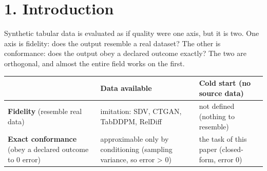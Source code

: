 \hypertarget{introduction}{%
\section{1. Introduction}\label{introduction}}

Synthetic tabular data is evaluated as if quality were one axis, but it
is two. One axis is fidelity: does the output resemble a real dataset?
The other is conformance: does the output obey a declared outcome
exactly? The two are orthogonal, and almost the entire field works on
the first.

\begin{longtable}[]{@{}lll@{}}
\toprule
\begin{minipage}[b]{0.30\columnwidth}\raggedright
\strut
\end{minipage} & \begin{minipage}[b]{0.30\columnwidth}\raggedright
Data available\strut
\end{minipage} & \begin{minipage}[b]{0.30\columnwidth}\raggedright
Cold start (no source data)\strut
\end{minipage}\tabularnewline
\midrule
\endhead
\begin{minipage}[t]{0.30\columnwidth}\raggedright
\textbf{Fidelity} (resemble real data)\strut
\end{minipage} & \begin{minipage}[t]{0.30\columnwidth}\raggedright
imitation: SDV, CTGAN, TabDDPM, RelDiff\strut
\end{minipage} & \begin{minipage}[t]{0.30\columnwidth}\raggedright
not defined (nothing to resemble)\strut
\end{minipage}\tabularnewline
\begin{minipage}[t]{0.30\columnwidth}\raggedright
\textbf{Exact conformance} (obey a declared outcome to 0 error)\strut
\end{minipage} & \begin{minipage}[t]{0.30\columnwidth}\raggedright
approximable only by conditioning (sampling variance, so error
\textgreater{} 0)\strut
\end{minipage} & \begin{minipage}[t]{0.30\columnwidth}\raggedright
the task of this paper (closed-form, error 0)\strut
\end{minipage}\tabularnewline
\bottomrule
\end{longtable}

